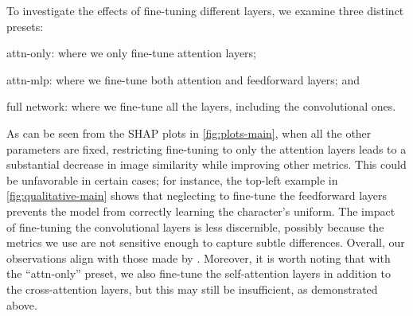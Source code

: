 
To investigate the effects of fine-tuning different layers, we examine three distinct presets:
\begin{enumerate*}
    \item attn-only: where we only fine-tune attention layers;
    \item attn-mlp: where we fine-tune both attention and feedforward layers; and
    \item full network: where we fine-tune all the layers, including the convolutional ones.
\end{enumerate*}
As can be seen from the SHAP plots in \cref{fig:plots-main}, when all the other parameters are fixed, restricting fine-tuning to only the attention layers leads to a substantial decrease in image similarity while improving other metrics.  This could be unfavorable in certain cases; for instance, the top-left example in \cref{fig:qualitative-main} shows that neglecting to fine-tune the feedforward layers prevents the model from correctly learning the character's uniform.
The impact of fine-tuning the convolutional layers is less discernible, possibly because the metrics we use are not sensitive enough to capture subtle differences.
Overall, our observations align with those made by \cite{han2023svdiff}.
Moreover, it is worth noting that with the ``attn-only'' preset, we also fine-tune the self-attention layers in addition to the cross-attention layers, but this may still be insufficient, as demonstrated above.

